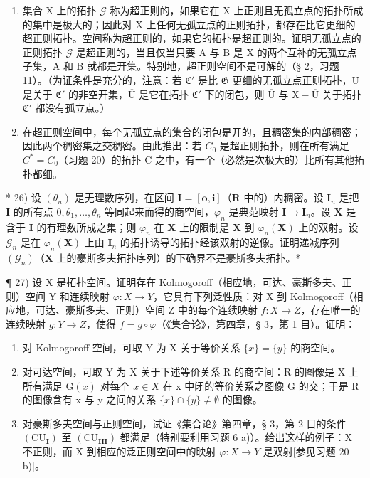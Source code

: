 \begin{enumerate}
\def\labelenumi{\alph{enumi})}
\setcounter{enumi}{1}
\item
  集合 X 上的拓扑 \(\mathcal{G}\) 称为超正则的，如果它在 X 上正则且无孤立点的拓扑所成的集中是极大的；因此对 X 上任何无孤立点的正则拓扑，都存在比它更细的超正则拓扑。空间称为超正则的，如果它的拓扑是超正则的。证明无孤立点的正则拓扑 \(\mathcal{G}\) 是超正则的，当且仅当只要 A 与 B 是 X 的两个互补的无孤立点子集，A 和 B 就都是开集。特别地，超正则空间不是可解的（§ 2，习题 11）。（为证条件是充分的，注意：若 \(\mathfrak{C}'\) 是比 \(\mathfrak{G}\) 更细的无孤立点正则拓扑，U 是关于 \(\mathfrak{C}'\) 的非空开集，\(\overline{\mathrm{U}}\) 是它在拓扑 \(\mathfrak{C}'\) 下的闭包，则 \(\overline{\mathrm{U}}\) 与 \(\mathrm{X} - \overline{\mathrm{U}}\) 关于拓扑 \(\mathfrak{C}'\) 都没有孤立点。）
\item
  在超正则空间中，每个无孤立点的集合的闭包是开的，且稠密集的内部稠密；因此两个稠密集之交稠密。由此推出：若 \(C_{0}\) 是超正则拓扑，则在所有满足 \(C^{*} = C_{0}\)（习题 20）的拓扑 C 之中，有一个（必然是次极大的）比所有其他拓扑都细。
\end{enumerate}

* 26) 设 \((\theta_{n})\) 是无理数序列，在区间 \(\mathbf{I} = [\mathbf{o},\mathbf{i}]\)（\(\mathbf{R}\) 中的）内稠密。设 \(\mathbf{I}_n\) 是把 \(\mathbf{I}\) 的所有点 \(0, \theta_1, \ldots, \theta_n\) 等同起来而得的商空间，\(\varphi_n\) 是典范映射 \(\mathbf{I} \to \mathbf{I}_n\)。设 \(\mathbf{X}\) 是含于 \(\mathbf{I}\) 的有理数所成之集；则 \(\varphi_n\) 在 \(\mathbf{X}\) 上的限制是 \(\mathbf{X}\) 到 \(\varphi_n(\mathbf{X})\) 上的双射。设 \(\mathcal{G}_n\) 是在 \(\varphi_n(\mathbf{X})\) 上由 \(\mathbf{I}_n\) 的拓扑诱导的拓扑经该双射的逆像。证明递减序列 \((\mathcal{G}_n)\)（\(\mathbf{X}\) 上的豪斯多夫拓扑序列）的下确界不是豪斯多夫拓扑。*

¶ 27) 设 X 是拓扑空间。证明存在 Kolmogoroff（相应地，可达、豪斯多夫、正则）空间 Y 和连续映射 \(\varphi: X \to Y\)，它具有下列泛性质：对 X 到 Kolmogoroff（相应地，可达、豪斯多夫、正则）空间 Z 中的每个连续映射 \(f: X \to Z\)，存在唯一的连续映射 \(g: Y \to Z\)，使得 \(f = g \circ \varphi\)（《集合论》，第四章，§ 3，第 1 目）。证明：

\begin{enumerate}
\def\labelenumi{\alph{enumi})}
\item
  对 Kolmogoroff 空间，可取 Y 为 X 关于等价关系 \(\{\bar{x}\}=\{\bar{y}\}\) 的商空间。
\item
  对可达空间，可取 Y 为 X 关于下述等价关系 R 的商空间：R 的图像是 X 上所有满足 \(\mathrm{G}(x)\) 对每个 \(x \in X\) 在 x 中闭的等价关系之图像 G 的交；于是 R 的图像含有 x 与 y 之间的关系 \(\{\bar{x}\} \cap \{\bar{y}\} \neq \emptyset\) 的图像。
\item
  对豪斯多夫空间与正则空间，试证《集合论》第四章，§ 3，第 2 目的条件 \((\mathrm{CU}_{\mathbf{I}})\) 至 \((\mathrm{CU}_{\mathbf{III}})\) 都满足（特别要利用习题 6 a)）。给出这样的例子：X 不正则，而 X 到相应的泛正则空间中的映射 \(\varphi: X \to Y\) 是双射{[}参见习题 20 b){]}。
\end{enumerate}

